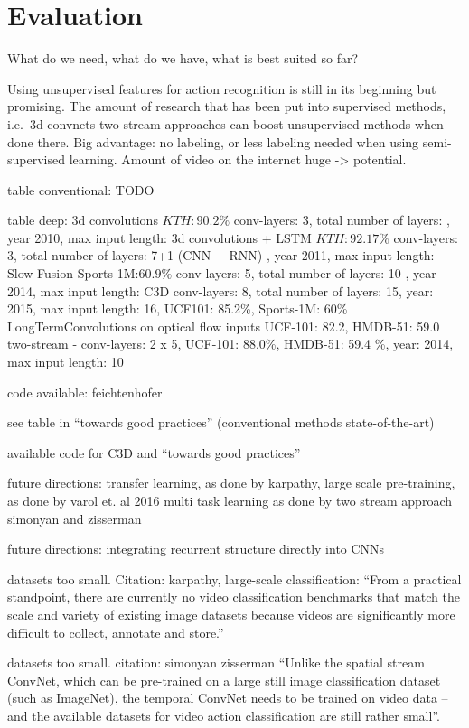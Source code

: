 \section{Evaluation}
What do we need, what do we have, what is best suited so far?

Using unsupervised features for action recognition is still in its beginning but promising.
The amount of research that has been put into supervised methods, i.e.\ 3d convnets two-stream approaches can boost unsupervised methods when done there.
Big advantage: no labeling, or less labeling needed when using semi-supervised learning.
Amount of video on the internet huge -> potential.

table conventional:
TODO

table deep:
3d convolutions \cite{ji_3d_2013}  $KTH:90.2\%$ conv-layers: 3, total number of layers: , year 2010, max input length:
3d convolutions + LSTM \cite{baccouche_sequential_2011} $KTH:92.17\%$ conv-layers: 3, total number of layers: 7+1 (CNN + RNN) , year 2011, max input length:
Slow Fusion \cite{karpathy_large-scale_2014} Sports-1M:$60.9\%$ conv-layers: 5, total number of layers: 10 , year 2014, max input length: 
C3D conv-layers: 8, total number of layers: 15, year: 2015, max input length: 16, UCF101: 85.2\%, Sports-1M: 60\%
LongTermConvolutions on optical flow inputs UCF-101: 82.2, HMDB-51: 59.0
two-stream \cite{simonyan_two-stream_2014} - conv-layers: 2 x 5, UCF-101: 88.0\%, HMDB-51: 59.4 \%, year: 2014, max input length: 10

code available: feichtenhofer

see table in ``towards good practices'' (conventional methods state-of-the-art)

available code for C3D and ``towards good practices''

future directions: transfer learning, as done by karpathy, large scale
pre-training, as done by varol et. al 2016
multi task learning as done by two stream approach simonyan and zisserman

future directions: integrating recurrent structure directly into CNNs 

datasets too small. Citation: karpathy, large-scale classification: ``From a practical standpoint, there are currently no video classification benchmarks that match the scale and variety of existing image datasets because videos are significantly more difficult to collect, annotate and store.''

datasets too small. citation: simonyan zisserman ``Unlike the spatial stream ConvNet, which can be pre-trained on a large still image classification dataset (such as ImageNet), the temporal ConvNet needs to be trained on video data – and the available datasets for video action classification are still rather small''.

